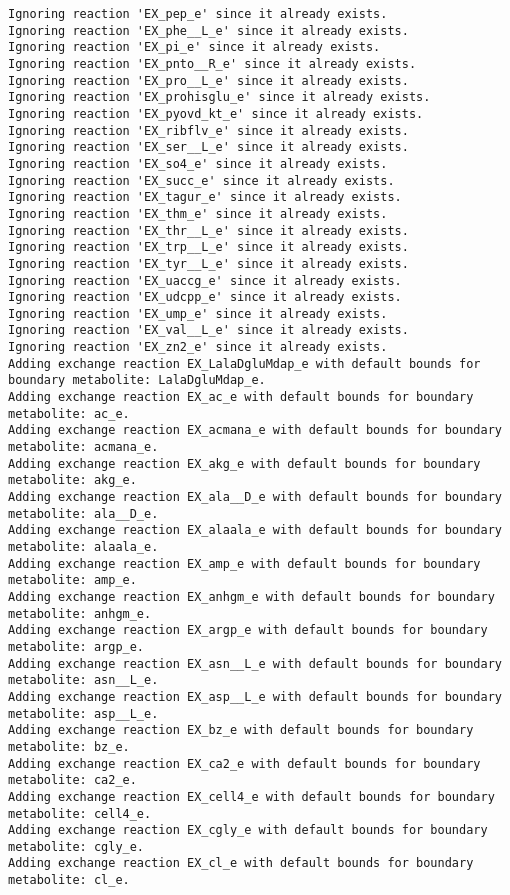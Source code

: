 \documentclass[
  letterpaper,
  DIV=11,
  numbers=noendperiod]{scrartcl}
\begin{document}
\begin{verbatim}
Ignoring reaction 'EX_pep_e' since it already exists.
Ignoring reaction 'EX_phe__L_e' since it already exists.
Ignoring reaction 'EX_pi_e' since it already exists.
Ignoring reaction 'EX_pnto__R_e' since it already exists.
Ignoring reaction 'EX_pro__L_e' since it already exists.
Ignoring reaction 'EX_prohisglu_e' since it already exists.
Ignoring reaction 'EX_pyovd_kt_e' since it already exists.
Ignoring reaction 'EX_ribflv_e' since it already exists.
Ignoring reaction 'EX_ser__L_e' since it already exists.
Ignoring reaction 'EX_so4_e' since it already exists.
Ignoring reaction 'EX_succ_e' since it already exists.
Ignoring reaction 'EX_tagur_e' since it already exists.
Ignoring reaction 'EX_thm_e' since it already exists.
Ignoring reaction 'EX_thr__L_e' since it already exists.
Ignoring reaction 'EX_trp__L_e' since it already exists.
Ignoring reaction 'EX_tyr__L_e' since it already exists.
Ignoring reaction 'EX_uaccg_e' since it already exists.
Ignoring reaction 'EX_udcpp_e' since it already exists.
Ignoring reaction 'EX_ump_e' since it already exists.
Ignoring reaction 'EX_val__L_e' since it already exists.
Ignoring reaction 'EX_zn2_e' since it already exists.
Adding exchange reaction EX_LalaDgluMdap_e with default bounds for boundary metabolite: LalaDgluMdap_e.
Adding exchange reaction EX_ac_e with default bounds for boundary metabolite: ac_e.
Adding exchange reaction EX_acmana_e with default bounds for boundary metabolite: acmana_e.
Adding exchange reaction EX_akg_e with default bounds for boundary metabolite: akg_e.
Adding exchange reaction EX_ala__D_e with default bounds for boundary metabolite: ala__D_e.
Adding exchange reaction EX_alaala_e with default bounds for boundary metabolite: alaala_e.
Adding exchange reaction EX_amp_e with default bounds for boundary metabolite: amp_e.
Adding exchange reaction EX_anhgm_e with default bounds for boundary metabolite: anhgm_e.
Adding exchange reaction EX_argp_e with default bounds for boundary metabolite: argp_e.
Adding exchange reaction EX_asn__L_e with default bounds for boundary metabolite: asn__L_e.
Adding exchange reaction EX_asp__L_e with default bounds for boundary metabolite: asp__L_e.
Adding exchange reaction EX_bz_e with default bounds for boundary metabolite: bz_e.
Adding exchange reaction EX_ca2_e with default bounds for boundary metabolite: ca2_e.
Adding exchange reaction EX_cell4_e with default bounds for boundary metabolite: cell4_e.
Adding exchange reaction EX_cgly_e with default bounds for boundary metabolite: cgly_e.
Adding exchange reaction EX_cl_e with default bounds for boundary metabolite: cl_e.

\end{verbatim}
\end{document}
